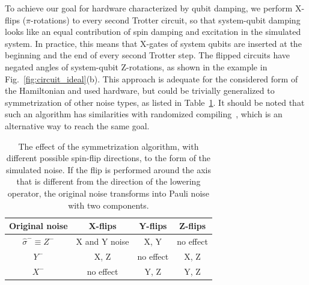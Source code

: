 \documentclass[twocolumn,amsmath,amssymb,pra]{revtex4-2}
\begin{document}
To achieve our goal for hardware characterized by qubit damping,
we perform X-flips ($\pi$-rotations) to every second Trotter circuit,
so that system-qubit damping looks like an equal contribution of spin damping and excitation in the simulated system.
In practice, this means that X-gates of system qubits are inserted at the beginning and the end of every second Trotter step.
The flipped circuits have negated angles of system-qubit Z-rotations, as shown in the example in Fig.~\ref{fig:circuit_ideal}(b).
This approach is adequate for the considered form of the Hamiltonian and used hardware, but could
be trivially generalized to symmetrization of other noise types,
as listed in Table~\ref{tab:effect_of_symmetrization}.
It should be noted that
such an algorithm has similarities with randomized compiling~\cite{Wallman2016, Hashim2021, Perrin2024},
which is an alternative way to reach the same goal. 
\begin{table}[ht]
\begin{tabular}{cccc}
\hline
Original noise & X-flips  & Y-flips  & Z-flips  \\
\hline
$\hat\sigma^{-}\equiv Z^{-}$ & X and Y noise & X, Y & no effect \\
$Y^{-}$                & X, Z & no effect & X, Z \\
$X^{-}$                & no effect & Y, Z & Y, Z \\
\hline
\end{tabular}
\centering
\caption{
The effect of the symmetrization algorithm, with different possible spin-flip directions, to the form of the simulated noise.
If the flip is performed around the axis that is different from the direction of the lowering operator, the original noise transforms into Pauli noise with two components.
}
\label{tab:effect_of_symmetrization}
\end{table}
\end{document}
